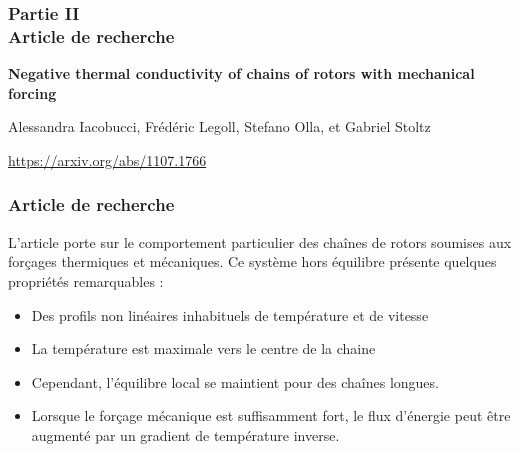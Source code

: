 \begin{frame}

    \frametitle{Partie II \\ Article de recherche}

    \textbf{Negative thermal conductivity of chains of rotors with mechanical forcing}
    \cite{Iacobucci_2011}

    Alessandra Iacobucci, Frédéric Legoll, Stefano Olla, et Gabriel Stoltz

    \url{https://arxiv.org/abs/1107.1766}

\end{frame}

\begin{frame}

    \frametitle{Article de recherche}

    L'article porte sur le comportement particulier des chaînes de rotors soumises
    aux forçages thermiques et mécaniques. Ce système hors équilibre présente
    quelques propriétés remarquables :

    \begin{itemize}

        \item Des profils non linéaires inhabituels de température et de vitesse

        \item La température est maximale vers le centre de la chaine

        \item Cependant, l'équilibre local se maintient pour des chaînes longues.

        \item Lorsque le forçage mécanique est suffisamment fort, le flux
        d'énergie peut être augmenté par un gradient de \alert{température inverse}.

    \end{itemize}

\end{frame}
